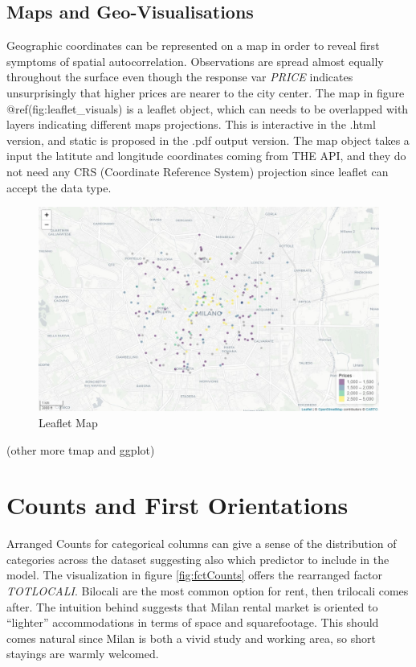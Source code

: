 \documentclass[
  12pt,
  a4paper,
  oneside]{book}
\theoremstyle{definition}
\theoremstyle{definition}
\theoremstyle{definition}
\theoremstyle{remark}
\begin{document}
\hypertarget{maps-and-geo-visualisations}{%
\subsection{Maps and Geo-Visualisations}\label{maps-and-geo-visualisations}}

Geographic coordinates can be represented on a map in order to reveal first symptoms of spatial autocorrelation. Observations are spread almost equally throughout the surface even though the response var \emph{PRICE} indicates unsurprisingly that higher prices are nearer to the city center.
The map in figure @ref(fig:leaflet\_visuals) is a leaflet object, which can needs to be overlapped with layers indicating different maps projections. This is interactive in the .html version, and static is proposed in the .pdf output version. The map object takes a input the latitute and longitude coordinates coming from THE API, and they do not need any CRS (Coordinate Reference System) projection since leaflet can accept the data type.

\begin{figure}
\includegraphics[width=1\linewidth]{images/leaflet_prezzi} \caption{Leaflet Map}\label{fig:LeafletVisuals}
\end{figure}

(other more tmap and ggplot)

\hypertarget{counts-and-first-orientations}{%
\section{Counts and First Orientations}\label{counts-and-first-orientations}}

Arranged Counts for categorical columns can give a sense of the distribution of categories across the dataset suggesting also which predictor to include in the model. The visualization in figure \ref{fig:fctCounts} offers the rearranged factor \emph{TOTLOCALI}.
Bilocali are the most common option for rent, then trilocali comes after. The intuition behind suggests that Milan rental market is oriented to ``lighter'' accommodations in terms of space and squarefootage. This should comes natural since Milan is both a vivid study and working area, so short stayings are warmly welcomed.
\end{document}
